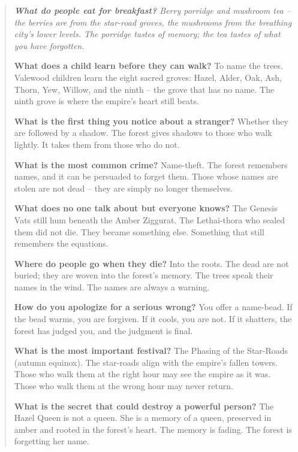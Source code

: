 \documentclass[12pt,oneside]{book}
\newenvironment{almanac}
  {\begin{quote}\small\itshape}
  {\end{quote}}
\begin{document}
\vspace{1em}
\begin{almanac}
\textbf{What do people eat for breakfast?} Berry porridge and mushroom tea -- the berries are from the star-road groves, the mushrooms from the breathing city's lower levels. The porridge tastes of memory; the tea tastes of what you have forgotten.

\textbf{What does a child learn before they can walk?} To name the trees. Valewood children learn the eight sacred groves: Hazel, Alder, Oak, Ash, Thorn, Yew, Willow, and the ninth -- the grove that has no name. The ninth grove is where the empire's heart still beats.

\textbf{What is the first thing you notice about a stranger?} Whether they are followed by a shadow. The forest gives shadows to those who walk lightly. It takes them from those who do not.

\textbf{What is the most common crime?} Name-theft. The forest remembers names, and it can be persuaded to forget them. Those whose names are stolen are not dead -- they are simply no longer themselves.

\textbf{What does no one talk about but everyone knows?} The Genesis Vats still hum beneath the Amber Ziggurat. The Lethai-thora who sealed them did not die. They became something else. Something that still remembers the equations.

\textbf{Where do people go when they die?} Into the roots. The dead are not buried; they are woven into the forest's memory. The trees speak their names in the wind. The names are always a warning.

\textbf{How do you apologize for a serious wrong?} You offer a name-bead. If the bead warms, you are forgiven. If it cools, you are not. If it shatters, the forest has judged you, and the judgment is final.

\textbf{What is the most important festival?} The Phasing of the Star-Roads (autumn equinox). The star-roads align with the empire's fallen towers. Those who walk them at the right hour may see the empire as it was. Those who walk them at the wrong hour may never return.

\textbf{What is the secret that could destroy a powerful person?} The Hazel Queen is not a queen. She is a memory of a queen, preserved in amber and rooted in the forest's heart. The memory is fading. The forest is forgetting her name.
\end{almanac}
\end{document}
